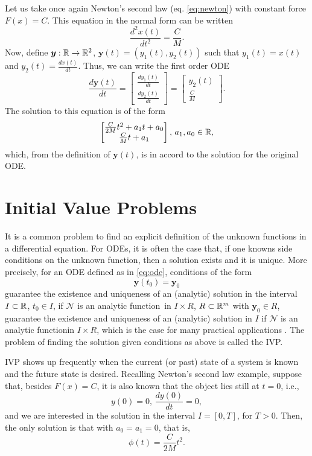 Let us take once again Newton's second law (eq. \eqref{eq:newton}) with constant force $F(x)=C$.
This equation in the normal form can be written
\[
    \frac{d^2 x\left( t \right) }{dt^2} = \frac{C}{M}
.\] 
Now, define $\bm{y}:\mathbb{R}\to \mathbb{R}^2$, $\bm{y}(t) = \left( y_1\left( t \right) ,y_2\left( t \right)  \right) $ such that $y_1(t) = x(t)$ and $y_2(t)=\frac{d x(t)}{dt}$. 
Thus, we can write the first order \gls{ODE}
\[
    \frac{d \bm{y}\left( t \right) }{dt} = \begin{bmatrix} \frac{d y_1\left( t \right) }{dt} \\ \frac{d y_2\left( t \right) }{dt} \end{bmatrix} = \begin{bmatrix} y_2(t) \\ \frac{C}{M} \end{bmatrix} 
.\]
The solution to this equation is of the form
\[
    \begin{bmatrix} \frac{C}{2M}t^2 +a_1t + a_0 \\ \frac{C}{M}t + a_1 \end{bmatrix},\, a_1,a_0 \in \mathbb{R}
,\]
which, from the definition of $\bm{y}(t)$, is in accord to the solution for the original ODE.

\section{Initial Value Problems}

It is a common problem to find an explicit definition of the unknown functions in a differential equation.
For \gls{ODE}s, it is often the case that, if one knowns side conditions on the unknown function, then a solution exists and it is unique.
More precisely, for an \gls{ODE} defined as in \eqref{eq:ode}, conditions of the form \[
   \bm{y}\left( t_0 \right) =\bm{y}_0
\] guarantee the existence and uniqueness of an (analytic) solution in the interval $I\subset \mathbb{R}$, $t_0\in I$, if $\mathcal{N}$ is an analytic function\footnotemark\, in $I\times R$, $R\subset \mathbb{R}^m$ with $\bm{y}_0\in R$, guarantee the existence and uniqueness of an (analytic) solution in $I$ if $\mathcal{N}$ is an analytic function\footnotemark in $I\times R$, which is the case for many practical applications \cite{iserles_first_2008}.
The problem of finding the solution given conditions as above is called the \gls{IVP}.

\gls{IVP} shows up frequently when the current (or past) state of a system is known and the future state is desired.
Recalling Newton's second law example, suppose that, besides $F(x)=C$, it is also known that the object lies still at $t=0$, i.e., \[
y(0) = 0,\,\frac{d y(0)}{dt}=0
,\] and we are interested in the solution in the interval $I=\left[ 0,T \right] $, for $T>0$. Then, the only solution is that with $a_0=a_1=0$, that is, \[
    \phi\left( t \right) = \frac{C}{2M}t^2
.\] 

